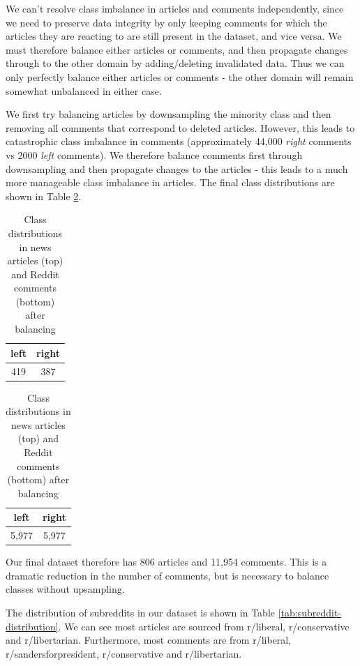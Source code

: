 We can't resolve class imbalance in articles and comments independently, since we need to preserve data integrity by only keeping comments for which the articles they are reacting to are still present in the dataset, and vice versa. We must therefore balance either articles or comments, and then propagate changes through to the other domain by adding/deleting invalidated data. Thus we can only perfectly balance either articles or comments - the other domain will remain somewhat unbalanced in either case.

We first try balancing articles by downsampling the minority class and then removing all comments that correspond to deleted articles. However, this leads to catastrophic class imbalance in comments (approximately 44,000 \textit{right} comments vs 2000 \textit{left} comments). We therefore balance comments first through downsampling and then propagate changes to the articles - this leads to a much more manageable class imbalance in articles. The final class distributions are shown in Table \ref{tab:reddit-classes-after-balancing}.

\begin{table}[ht]
    \begin{center}
        \begin{tabular}{|c|c|}
            \hline
            left & right \\
            \hline
            419 & 387 \\
            \hline
        \end{tabular}
    \end{center} \vspace{5pt}
    \begin{center}
        \begin{tabular}{|c|c|}
            \hline
            left & right \\
            \hline
            5,977 & 5,977 \\
            \hline
        \end{tabular}
    \end{center}
    \caption{Class distributions in news articles (top) and Reddit comments (bottom) after balancing}
    \label{tab:reddit-classes-after-balancing}
\end{table}

Our final dataset therefore has 806 articles and 11,954 comments. This is a dramatic reduction in the number of comments, but is necessary to balance classes without upsampling.

The distribution of subreddits in our dataset is shown in Table \ref{tab:subreddit-distribution}. We can see most articles are sourced from r/liberal, r/conservative and r/libertarian. Furthermore, most comments are from r/liberal, r/sandersforpresident, r/conservative and r/libertarian.


